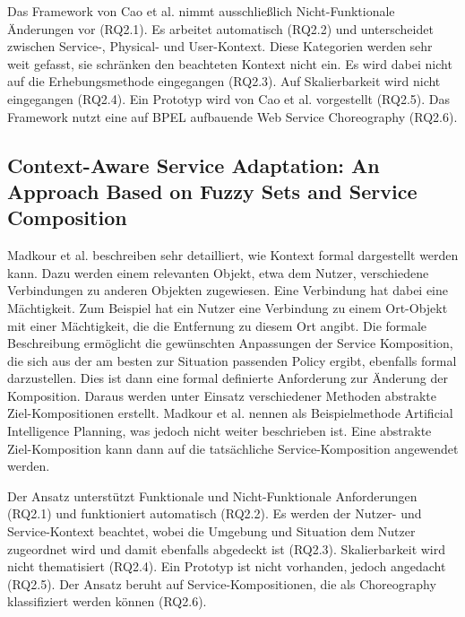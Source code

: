 \documentclass[conference,compsoc]{IEEEtran}
\begin{document}
Das Framework von Cao et al. \cite{CZZ15} nimmt ausschließlich Nicht-Funktionale Änderungen vor (RQ2.1). Es arbeitet automatisch (RQ2.2) und unterscheidet zwischen Service-, Physical- und User-Kontext. Diese Kategorien werden sehr weit gefasst, sie schränken den beachteten Kontext nicht ein. Es wird dabei nicht auf die Erhebungsmethode eingegangen (RQ2.3). Auf Skalierbarkeit wird nicht eingegangen (RQ2.4). Ein Prototyp wird von Cao et al. \cite{CZZ15} vorgestellt (RQ2.5). Das Framework nutzt eine auf BPEL aufbauende Web Service Choreography (RQ2.6).

\subsection{Context-Aware Service Adaptation: An Approach Based on Fuzzy Sets and Service Composition}
Madkour et al. \cite{MEM13} beschreiben sehr detailliert, wie Kontext formal dargestellt werden kann. Dazu werden einem relevanten Objekt, etwa dem Nutzer, verschiedene Verbindungen zu anderen Objekten zugewiesen. Eine Verbindung hat dabei eine Mächtigkeit. Zum Beispiel hat ein Nutzer eine Verbindung zu einem Ort-Objekt mit einer Mächtigkeit, die die Entfernung zu diesem Ort angibt. Die formale Beschreibung ermöglicht die gewünschten Anpassungen der Service Komposition, die sich aus der am besten zur Situation passenden Policy ergibt, ebenfalls formal darzustellen. Dies ist dann eine formal definierte Anforderung zur Änderung der Komposition. Daraus werden unter Einsatz verschiedener Methoden abstrakte Ziel-Kompositionen erstellt. Madkour et al. \cite{MEM13} nennen als Beispielmethode Artificial Intelligence Planning, was jedoch nicht weiter beschrieben ist. Eine abstrakte Ziel-Komposition kann dann auf die tatsächliche Service-Komposition angewendet werden.

Der Ansatz unterstützt Funktionale und Nicht-Funktionale Anforderungen (RQ2.1) und funktioniert automatisch (RQ2.2). Es werden der Nutzer- und Service-Kontext beachtet, wobei die Umgebung und Situation dem Nutzer zugeordnet wird und damit ebenfalls abgedeckt ist (RQ2.3). Skalierbarkeit wird nicht thematisiert (RQ2.4). Ein Prototyp ist nicht vorhanden, jedoch angedacht (RQ2.5). Der Ansatz beruht auf Service-Kompositionen, die als Choreography klassifiziert werden können (RQ2.6).
\end{document}
